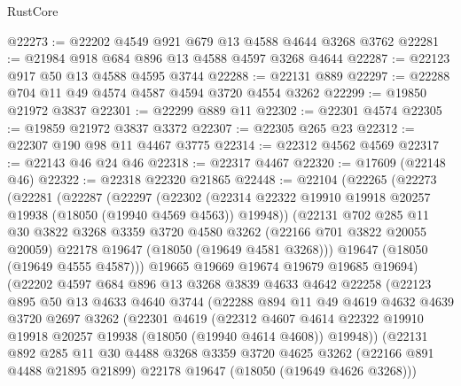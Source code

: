 \begin{lexlean}{RustCore}
\begin{coremodule}
@22273 := @22202 @4549 @921 @679 @13 @4588 @4644 @3268 @3762
@22281 := @21984 @918 @684 @896 @13 @4588 @4597 @3268 @4644
@22287 := @22123 @917 @50 @13 @4588 @4595 @3744
@22288 := @22131 @889
@22297 := @22288 @704 @11 @49 @4574 @4587 @4594 @3720 @4554 @3262
@22299 := @19850 @21972 @3837
@22301 := @22299 @889 @11
@22302 := @22301 @4574
@22305 := @19859 @21972 @3837 @3372
@22307 := @22305 @265 @23
@22312 := @22307 @190 @98 @11 @4467 @3775
@22314 := @22312 @4562 @4569
@22317 := @22143 @46 @24 @46
@22318 := @22317 @4467
@22320 := @17609 (@22148 @46)
@22322 := @22318 @22320 @21865
@22448 := @22104
    (@22265
      (@22273
        (@22281
          (@22287
            (@22297
              (@22302
                (@22314 @22322 @19910 @19918 @20257 @19938 (@18050 (@19940 @4569 @4563)) @19948))
              (@22131
                @702
                @285
                @11
                @30
                @3822
                @3268
                @3359
                @3720
                @4580
                @3262
                (@22166 @701 @3822 @20055 @20059)
                @22178
                @19647
                (@18050 (@19649 @4581 @3268)))
              @19647
              (@18050 (@19649 @4555 @4587)))
            @19665
            @19669
            @19674
            @19679
            @19685
            @19694)
          (@22202
            @4597
            @684
            @896
            @13
            @3268
            @3839
            @4633
            @4642
            @22258
            (@22123
              @895
              @50
              @13
              @4633
              @4640
              @3744
              (@22288
                @894
                @11
                @49
                @4619
                @4632
                @4639
                @3720
                @2697
                @3262
                (@22301
                  @4619
                  (@22312
                    @4607
                    @4614
                    @22322
                    @19910
                    @19918
                    @20257
                    @19938
                    (@18050 (@19940 @4614 @4608))
                    @19948))
                (@22131
                  @892
                  @285
                  @11
                  @30
                  @4488
                  @3268
                  @3359
                  @3720
                  @4625
                  @3262
                  (@22166 @891 @4488 @21895 @21899)
                  @22178
                  @19647
                  (@18050 (@19649 @4626 @3268)))

\end{coremodule}
\end{lexlean}
